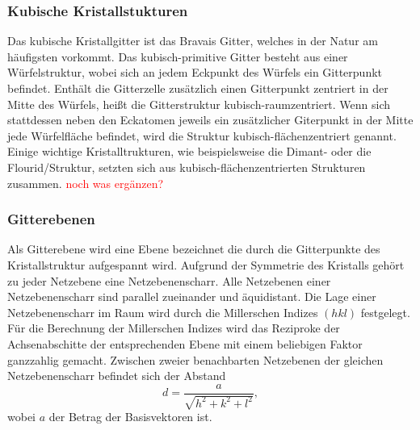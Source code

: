 \subsubsection{Kubische Kristallstukturen}
\label{sec:kubisch}
Das kubische Kristallgitter ist das Bravais Gitter, welches in der Natur am häufigsten vorkommt.
Das kubisch-primitive Gitter besteht aus einer Würfelstruktur, wobei sich an jedem Eckpunkt des Würfels ein Gitterpunkt befindet.
Enthält die Gitterzelle  zusätzlich einen Gitterpunkt zentriert in der Mitte des Würfels, heißt die Gitterstruktur kubisch-raumzentriert.
Wenn sich stattdessen neben den Eckatomen jeweils ein zusätzlicher Giterpunkt in der Mitte jede Würfelfläche befindet, wird die Struktur kubisch-flächenzentriert genannt.\\
Einige wichtige Kristalltrukturen, wie beispielsweise die Dimant- oder die Flourid\-/Struktur, setzten sich aus kubisch-flächenzentrierten Strukturen zusammen.
\textcolor{red}{noch was ergänzen?}

\subsubsection{Gitterebenen}
\label{sec:miller}
Als Gitterebene wird eine Ebene bezeichnet die durch die Gitterpunkte des Kristallstruktur aufgespannt wird.
Aufgrund der Symmetrie des Kristalls gehört zu jeder Netzebene eine Netzebenenscharr.
Alle Netzebenen einer Netzebenenscharr sind parallel zueinander und äquidistant.
Die Lage einer Netzebenenscharr im Raum wird durch die Millerschen Indizes $(hkl)$ festgelegt.
Für die Berechnung der Millerschen Indizes wird das Reziproke der Achsenabschitte der entsprechenden Ebene mit einem beliebigen Faktor ganzzahlig gemacht.
Zwischen zweier benachbarten Netzebenen der gleichen Netzebenenscharr befindet sich der Abstand
\begin{equation}
  d=\frac{a}{\sqrt{h^2+k^2+l^2}},
  \label{eq:d}
\end{equation}
wobei $a$ der Betrag der Basisvektoren ist.

